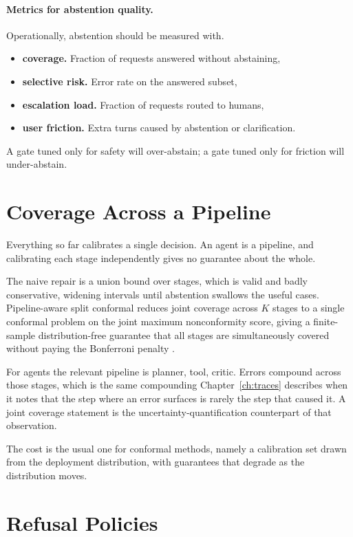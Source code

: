 \paragraph{Metrics for abstention quality.}
Operationally, abstention should be measured with.
\begin{itemize}
\item \textbf{coverage.} Fraction of requests answered without abstaining,
\item \textbf{selective risk.} Error rate on the answered subset,
\item \textbf{escalation load.} Fraction of requests routed to humans,
\item \textbf{user friction.} Extra turns caused by abstention or clarification.
\end{itemize}
A gate tuned only for safety will over-abstain; a gate tuned only for friction will under-abstain.

\section{Coverage Across a Pipeline}

Everything so far calibrates a single decision. An agent is a pipeline, and
calibrating each stage independently gives no guarantee about the whole.

The naive repair is a union bound over stages, which is valid and badly
conservative, widening intervals until abstention swallows the useful cases.
Pipeline-aware split conformal reduces joint coverage across $K$ stages to a
single conformal problem on the joint maximum nonconformity score, giving a
finite-sample distribution-free guarantee that all stages are simultaneously
covered without paying the Bonferroni penalty \cite{pasc2026}.

For agents the relevant pipeline is planner, tool, critic. Errors compound across
those stages, which is the same compounding Chapter~\ref{ch:traces} describes
when it notes that the step where an error surfaces is rarely the step that
caused it. A joint coverage statement is the uncertainty-quantification
counterpart of that observation.

The cost is the usual one for conformal methods, namely a calibration set drawn
from the deployment distribution, with guarantees that degrade as the
distribution moves.

\section{Refusal Policies}

